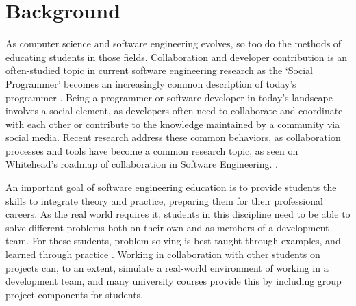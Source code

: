

\chapter{Background}
As computer science and software engineering evolves, so too do the methods of educating students in those fields. Collaboration and developer contribution is an often-studied topic in current software engineering research as the `Social Programmer' becomes an increasingly common description of today’s programmer \cite{treude2012programming}. Being a programmer or software developer in today’s landscape involves a social element, as developers often need to collaborate and coordinate with each other or contribute to the knowledge maintained by a community via social media. Recent research address these common behaviors, as collaboration processes and tools have become a common research topic, as seen on Whitehead's roadmap of collaboration in Software Engineering. \cite{whitehead2007collaboration}.

An important goal of software engineering education is to provide students the skills to integrate theory and practice, preparing them for their professional careers. As the real world requires it, students in this discipline need to be able to solve different problems both on their own and as members of a development team. For these students, problem solving is best taught through examples, and learned through practice \cite{jazayeri2004education}. Working in collaboration with other students on projects can, to an extent, simulate a real-world environment of working in a development team, and many university courses provide this by including group project components for students.

